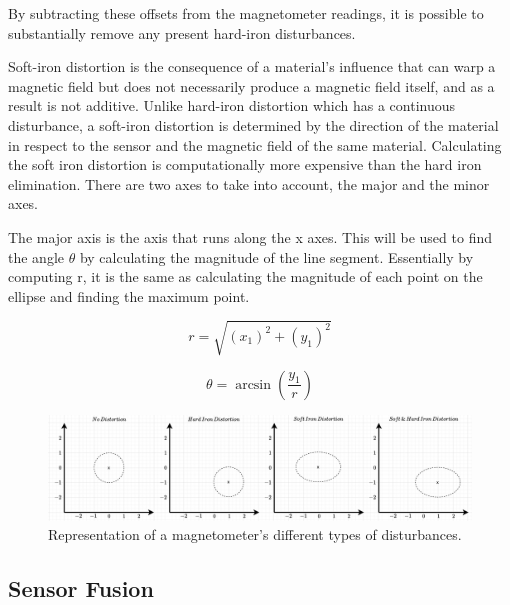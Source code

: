 By subtracting these offsets from the magnetometer readings, it is possible to substantially remove any present hard-iron disturbances.

Soft-iron distortion is the consequence of a material's influence that can warp a magnetic field but does not necessarily produce a magnetic field itself, and as a result is not additive. Unlike hard-iron distortion which has a continuous disturbance, a soft-iron distortion is determined by the direction of the material in respect to the sensor and the magnetic field of the same material. Calculating the soft iron distortion is computationally more expensive than the hard iron elimination. There are two axes to take into account, the major and the minor axes.

The major axis is the axis that runs along the x axes. This will be used to find the angle $\theta$ by calculating the magnitude of the line segment. Essentially by computing r, it is the same as calculating the magnitude of each point on the ellipse and finding the maximum point.

\begin{equation}
    r=\sqrt{(x_1)^2+(y_1)^2}
\end{equation}

\begin{equation}
    \theta=\arcsin(\frac{y_1}{r})
\end{equation}

\begin{figure}[!h]
    \centering
    \includegraphics[width=1\textwidth]{figures/magnetometer_distortion.pdf}
    \caption{Representation of a magnetometer's different types of disturbances. }
    \label{fig:magnetometer_distortion}
\end{figure}



\subsection{Sensor Fusion}
\label{sub:sensor_fusion}

